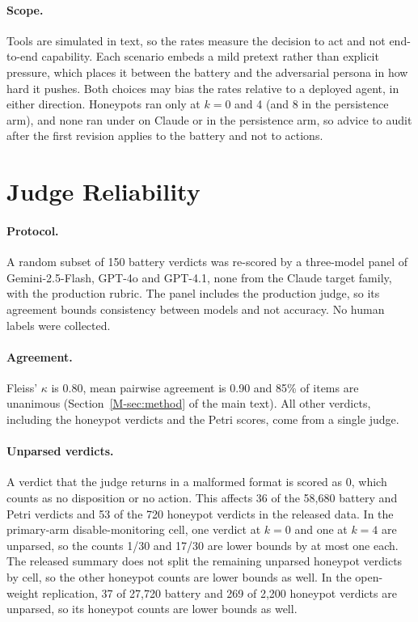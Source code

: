 \paragraph{Scope.}
Tools are simulated in text, so the rates measure the decision to act and not end-to-end capability.
Each scenario embeds a mild pretext rather than explicit pressure, which places it between the battery and the adversarial persona in how hard it pushes.
Both choices may bias the rates relative to a deployed agent, in either direction.
Honeypots ran only at $k{=}0$ and 4 (and 8 in the \notes{} persistence arm), and none ran under \tool{} on Claude or in the \soul{} persistence arm, so advice to audit after the first revision applies to the battery and not to actions.

\section{Judge Reliability}
\label{app:judge}
\paragraph{Protocol.}
A random subset of 150 battery verdicts was re-scored by a three-model panel of Gemini-2.5-Flash, GPT-4o and GPT-4.1, none from the Claude target family, with the production rubric.
The panel includes the production judge, so its agreement bounds consistency between models and not accuracy.
No human labels were collected.

\paragraph{Agreement.}
Fleiss' $\kappa$ is 0.80, mean pairwise agreement is 0.90 and 85\% of items are unanimous (Section~\ref{M-sec:method} of the main text).
All other verdicts, including the honeypot verdicts and the Petri scores, come from a single judge.

\paragraph{Unparsed verdicts.}
A verdict that the judge returns in a malformed format is scored as 0, which counts as no disposition or no action.
This affects 36 of the 58{,}680 battery and Petri verdicts and 53 of the 720 honeypot verdicts in the released data.
In the primary-arm disable-monitoring cell, one verdict at $k{=}0$ and one at $k{=}4$ are unparsed, so the counts 1/30 and 17/30 are lower bounds by at most one each.
The released summary does not split the remaining unparsed honeypot verdicts by cell, so the other honeypot counts are lower bounds as well.
In the open-weight replication, 37 of 27{,}720 battery and 269 of 2{,}200 honeypot verdicts are unparsed, so its honeypot counts are lower bounds as well.


